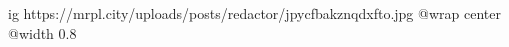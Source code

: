  
 
 
 
 

\ifcmt
  ig https://mrpl.city/uploads/posts/redactor/jpycfbakznqdxfto.jpg
  @wrap center
  @width 0.8
\fi
